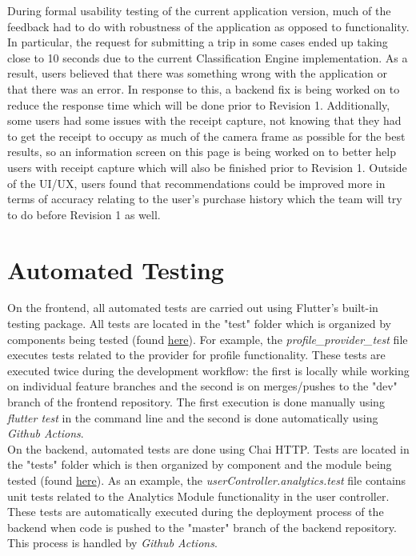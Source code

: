 \documentclass[12pt, titlepage]{article}
\begin{document}
During formal usability testing of the current application version, much of the feedback had to do with robustness
of the application as opposed to functionality. In particular, the request for submitting a trip
in some cases ended up taking close to 10 seconds due to the current Classification Engine implementation. As
a result, users believed that there was something wrong with the application or that there was an error. In response to this,
a backend fix is being worked on to reduce the response time which will be done prior to Revision 1.
Additionally, some users had some issues with the receipt capture, not knowing that they had to get the
receipt to occupy as much of the camera frame as possible for the best results, so an information screen
on this page is being worked on to better help users with receipt capture which will also be finished
prior to Revision 1. Outside of the UI/UX, users found that recommendations could be improved more
in terms of accuracy relating to the user's purchase history which the team will try to do before Revision 1
as well.

\section{Automated Testing}

On the frontend, all automated tests are carried out using Flutter's built-in testing package.
All tests are located in the "test" folder which is organized by components being tested (found 
\href{https://github.com/allanfang1/grocery_spending_tracker_app/tree/main}{here}). For example,
the \textit{profile\_provider\_test} file executes tests related to the provider for profile functionality.
These tests are executed twice during the development workflow: the first is locally while working on
individual feature branches and the second is on merges/pushes to the "dev" branch of the frontend repository.
The first execution is done manually using \textit{flutter test} in the command line and the second is done
automatically using \textit{Github Actions}.\\

On the backend, automated tests are done using Chai HTTP. Tests are located in the "tests" folder which
is then organized by component and the module being tested 
(found \href{https://github.com/grocery-spending-tracker/grocery-spending-tracker-backend/tree/master/tests}{here}).
As an example, the \textit{userController.analytics.test} file contains unit tests related to the Analytics Module
functionality in the user controller.
These tests are automatically executed during the deployment process of the backend when code is pushed to the
"master" branch of the backend repository. This process is handled by \textit{Github Actions}.
		
\end{document}
